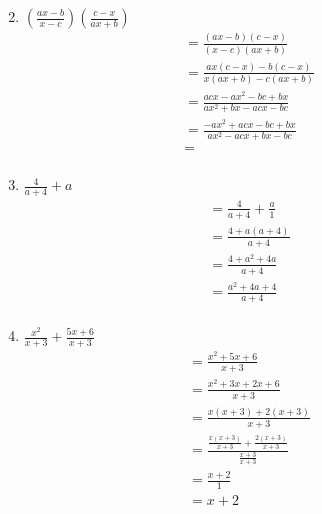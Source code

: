\documentclass{article}
\begin{document}
\begin{description}
\begin{enumerate}
\begin{equation}
                  \end{equation}
            \item $(\frac{ax-b}{x-c})(\frac{c-x}{ax+b})$
                  \begin{equation}
                      \begin{split}
                          & = \frac{(ax-b)(c-x)}{(x-c)(ax+b)}\\
                          & = \frac{ax(c-x)-b(c-x)}{x(ax+b)-c(ax+b)}\\
                          & = \frac{acx - ax^2 -bc +bx}{ax^2 +bx -acx - bc}\\
                          & = \frac{-ax^2 + acx -bc +bx}{ax^2 - acx +bx -bc}\\
                          & = \\
                      \end{split}
                  \end{equation}
            \item $\frac{4}{a+4}+a$
                  \begin{equation}
                      \begin{split}
                          & = \frac{4}{a+4}+ \frac{a}{1}\\
                          & = \frac{4 + a(a+4)}{a+4}\\
                          & = \frac{4+a^2+4a}{a+4}\\
                          & = \frac{a^2+4a+4}{a+4}\\
                      \end{split}
                  \end{equation}
            \item $\frac{x^2}{x+3}+\frac{5x+6}{x+3}$
                  \begin{equation}
                      \begin{split}
                          & = \frac{x^2+5x+6}{x+3}\\
                          & = \frac{x^2 + 3x + 2x + 6}{x+3}\\
                          & = \frac{x(x+3)+2(x+3)}{x+3}\\
                          & = \frac{\frac{x(x+3)}{x+3}+\frac{2(x+3)}{x+3}}{\frac{x+3}{x+3}}\\
                          & = \frac{x+2}{1}\\
                          & = x+2 \\
                      \end{split}

\end{equation}
\end{enumerate}
\end{description}
\end{document}
